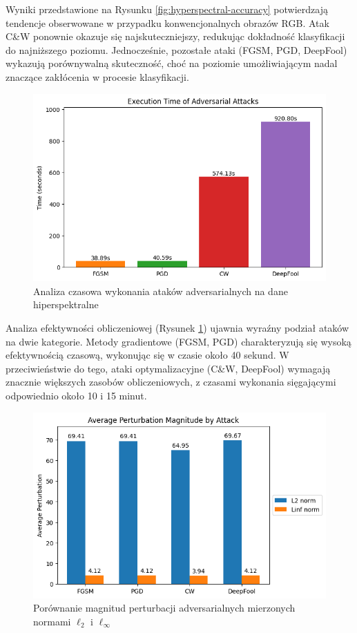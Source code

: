 \documentclass[12pt]{article}
\begin{document}
Wyniki przedstawione na Rysunku \ref{fig:hyperspectral-accuracy} potwierdzają tendencje obserwowane w przypadku konwencjonalnych obrazów RGB. Atak C\&W ponownie okazuje się najskuteczniejszy, redukując dokładność klasyfikacji do najniższego poziomu. Jednocześnie, pozostałe ataki (FGSM, PGD, DeepFool) wykazują porównywalną skuteczność, choć na poziomie umożliwiającym nadal znaczące zakłócenia w procesie klasyfikacji.

\begin{figure}[H]
    \centering
    \includegraphics[width=1\textwidth]{hybridsn_time.png} 
    \caption{Analiza czasowa wykonania ataków adversarialnych na dane hiperspektralne}
    \label{fig:hyperspectral-time}
\end{figure}

Analiza efektywności obliczeniowej (Rysunek \ref{fig:hyperspectral-time}) ujawnia wyraźny podział ataków na dwie kategorie. Metody gradientowe (FGSM, PGD) charakteryzują się wysoką efektywnością czasową, wykonując się w czasie około 40 sekund. W przeciwieństwie do tego, ataki optymalizacyjne (C\&W, DeepFool) wymagają znacznie większych zasobów obliczeniowych, z czasami wykonania sięgającymi odpowiednio około 10 i 15 minut.

\begin{figure}[H]
    \centering
    \includegraphics[width=1\textwidth]{perturbations.png} 
    \caption{Porównanie magnitud perturbacji adversarialnych mierzonych normami $\ell_2$ i $\ell_\infty$}
\end{figure}
\end{document}
